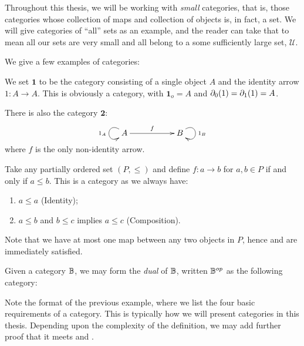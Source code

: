 Throughout   this thesis, we will be working with \emph{small} categories, that is, those categories
whose collection of maps and collection of objects is, in fact, a set. We will give categories of
``all'' sets as an example, and the reader can take that to mean all our sets are very small and all
belong to a some sufficiently large set, $\mathcal{U}$.

We give a few examples of categories:

\begin{example}\label{ex:small_finite_categories}
  We set $\mathbf{1}$ to be the category consisting of a single object $A$ and the identity arrow
  $1:A\to A$. This  is obviously a category, with $\mathbf{1}_o = A$ and
  $\partial_0({1}) = \partial_1({1}) = A$.

  There is also the category $\mathbf{2}$:
  \[
    \xymatrix{
      A\ar[rr]^{f} \ar@(ul,dl)[]_{1_A}& & B  \ar@(ur,dr)[]^{1_B}
    }
  \]
  where $f$ is the only non-identity arrow.
\end{example}

\begin{example}\label{ex:preorders-are-categories}
  Take any partially ordered set $(P,\le)$ and define $f:a \to b$ for $a,b\in P$ if and only if
  $a\le b$. This is a category as we always have:
  \begin{enumerate}[{(}i{)}]
  \item $a \le a$ (Identity);
  \item $a \le b$ and $b \le c$ implies $a\le c$ (Composition).
  \end{enumerate}
  Note that we have at most one map between any two objects in $P$, hence \catone and \cattwo are
  immediately satisfied.
\end{example}
\begin{example}\label{ex:dual_category}
Given a category $\mathbb{B}$, we may form the \emph{dual} of $\mathbb{B}$, written $\mathbb{B}^{op}$ as the following
category:
\end{example}

Note the format of the previous example, where we list the four basic requirements of a
category. This is typically how we will present categories in this thesis. Depending upon the
complexity of the definition, we may add further proof that it meets \catone and \cattwo.

